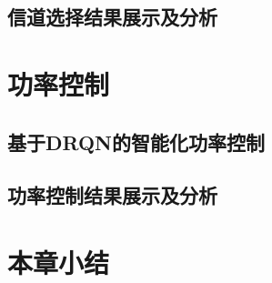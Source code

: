 \subsection{信道选择结果展示及分析}

\section{功率控制}
\subsection{基于DRQN的智能化功率控制}

\subsection{功率控制结果展示及分析}



\section{本章小结}






















